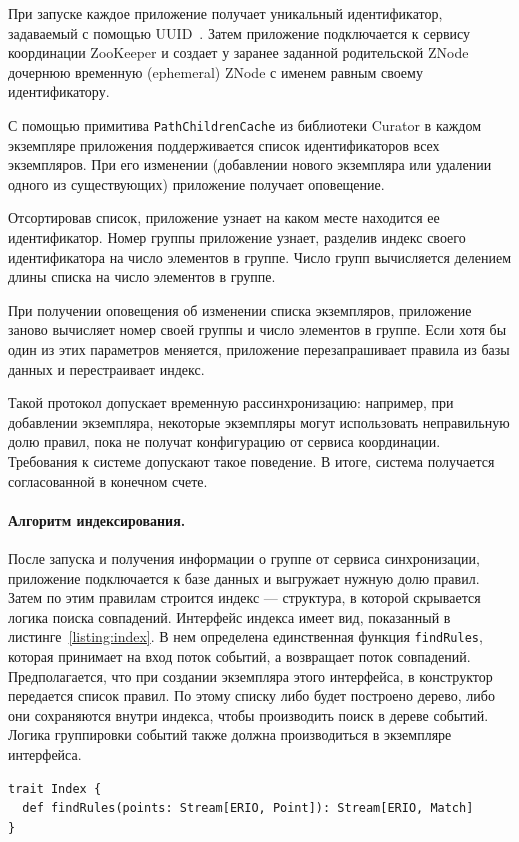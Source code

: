 \documentclass[14pt]{article}
\begin{document}
При запуске каждое приложение получает уникальный идентификатор, задаваемый с помощью UUID~\cite{uuid}. Затем приложение подключается к сервису координации ZooKeeper и создает у заранее заданной родительской ZNode дочернюю временную (ephemeral) ZNode с именем равным своему идентификатору. 

С помощью примитива \verb|PathChildrenCache| из библиотеки Curator в каждом экземпляре приложения поддерживается список идентификаторов всех экземпляров. При его изменении (добавлении нового экземпляра или удалении одного из существующих) приложение получает оповещение. 

Отсортировав список, приложение узнает на каком месте находится ее идентификатор. Номер группы приложение узнает, разделив индекс своего идентификатора на число элементов в группе. Число групп вычисляется делением длины списка на число элементов в группе. 

При получении оповещения об изменении списка экземпляров, приложение заново вычисляет номер своей группы и число элементов в группе. Если хотя бы один из этих параметров меняется, приложение перезапрашивает правила из базы данных и перестраивает индекс.

Такой протокол допускает временную рассинхронизацию: например, при добавлении экземпляра, некоторые экземпляры могут использовать неправильную долю правил, пока не получат конфигурацию от сервиса координации. Требования к системе допускают такое поведение. В итоге, система получается согласованной в конечном счете.

\paragraph{Алгоритм индексирования.} После запуска и получения информации о группе от сервиса синхронизации, приложение подключается к базе данных и выгружает нужную долю правил. Затем по этим правилам строится индекс --- структура, в которой скрывается логика поиска совпадений. Интерфейс индекса имеет вид, показанный в листинге~\ref{listing:index}. В нем определена единственная функция \verb|findRules|, которая принимает на вход поток событий, а возвращает поток совпадений. Предполагается, что при создании экземпляра этого интерфейса, в конструктор передается список правил. По этому списку либо будет построено дерево, либо они сохраняются внутри индекса, чтобы производить поиск в дереве событий. Логика группировки событий также должна производиться в экземпляре интерфейса.

\begin{lstlisting}[style=scalaStyle,caption={Интерфейс, описывающий индекс.},label={listing:index},captionpos=b, float]
trait Index {
  def findRules(points: Stream[ERIO, Point]): Stream[ERIO, Match]
}
\end{lstlisting}
\end{document}
